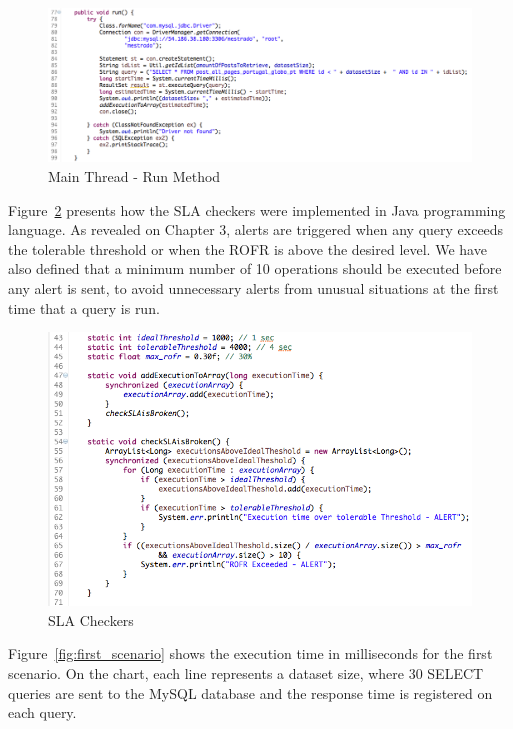 \begin{figure}[ht!]
\centering
\includegraphics[width=150mm]{Imagens/core-execution-01-2.png}
\caption{Main Thread - Run Method \label{fig:core-execution-01.2}}
\end{figure}


Figure~\ref{fig:core-execution-01.3} presents how the SLA checkers were implemented in Java programming language. As revealed on Chapter 3, alerts are triggered when any query exceeds the tolerable threshold or when the ROFR is above the desired level. We have also defined that a minimum number of 10 operations should be executed before any alert is sent, to avoid unnecessary alerts from unusual situations at the first time that a query is run.

\begin{figure}[ht!]
\centering
\includegraphics[width=120mm]{Imagens/core-execution-01-3.png}
\caption{SLA Checkers \label{fig:core-execution-01.3}}
\end{figure}


Figure~\ref{fig:first_scenario} shows the execution time in milliseconds for the first scenario. On the chart, each line represents a dataset size, where 30 SELECT queries are sent to the MySQL database and the response time is registered on each query. 

